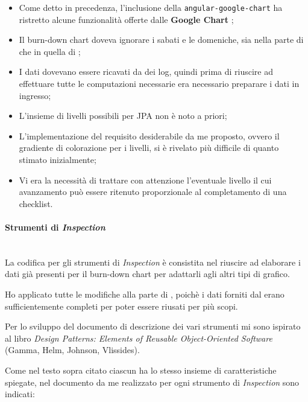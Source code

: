 \begin{itemize}
\item Come detto in precedenza, l'inclusione della 
  \texttt{angular-google-chart} ha ristretto alcune funzionalità offerte dalle
  \textbf{Google Chart };
\item Il burn-down chart doveva ignorare i sabati e le domeniche, sia nella
  parte di \BKEND{} che in quella di \FREND{};
\item I dati dovevano essere ricavati da dei log, quindi prima di riuscire ad
  effettuare tutte le computazioni necessarie era necessario preparare i dati
  in ingresso;
\item L'insieme di livelli possibili per JPA non è noto a priori;
\item L'implementazione del requisito desiderabile da me proposto, ovvero il
  gradiente di colorazione per i livelli, si è rivelato più difficile di
  quanto stimato inizialmente;
\item Vi era la necessità di trattare con attenzione l'eventuale livello il
  cui avanzamento può essere ritenuto proporzionale al completamento di una
  checklist.
\end{itemize}

\paragraph{Strumenti di \emph{Inspection}} \mbox{} \\

La codifica per gli strumenti di \emph{Inspection} è consistita nel riuscire
ad elaborare i dati già presenti per il burn-down chart per adattarli agli
altri tipi di grafico.

Ho applicato tutte le modifiche alla parte di \FREND{}, poichè i dati
forniti dal \BKEND{} erano sufficientemente completi per poter essere riusati
per più scopi.

Per lo sviluppo del documento di descrizione dei vari strumenti mi sono
ispirato al libro \emph{Design Patterns: Elements of Reusable Object-Oriented
Software} (Gamma, Helm, Johnson, Vlissides).

Come nel testo sopra citato ciascun  ha lo stesso
insieme di caratteristiche spiegate, nel documento da me realizzato per ogni
strumento di \emph{Inspection} sono indicati:

